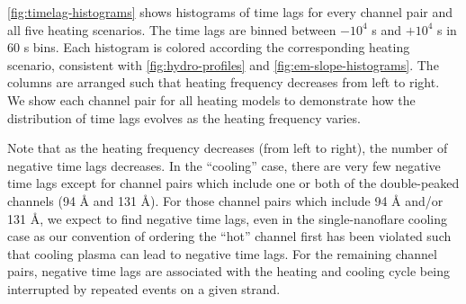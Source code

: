 \autoref{fig:timelag-histograms} shows histograms of time lags for every channel pair and all five heating scenarios. The time lags are binned between $-10^4$ s and $+10^4$ s in 60 s bins. Each histogram is colored according the corresponding heating scenario, consistent with \autoref{fig:hydro-profiles} and \autoref{fig:em-slope-histograms}. The columns are arranged such that heating frequency decreases from left to right. We show each channel pair for all heating models to demonstrate how the distribution of time lags evolves as the heating frequency varies.

Note that as the heating frequency decreases (from left to right), the number of negative time lags decreases. In the ``cooling'' case, there are very few negative time lags except for channel pairs which include one or both of the double-peaked channels (94 \AA{} and 131 \AA{}). For those channel pairs which include 94 \AA{} and/or 131 \AA{}, we expect to find negative time lags, even in the single-nanoflare cooling case as our convention of ordering the ``hot'' channel first has been violated such that cooling plasma can lead to negative time lags. For the remaining channel pairs, negative time lags are associated with the heating and cooling cycle being interrupted by repeated events on a given strand.
